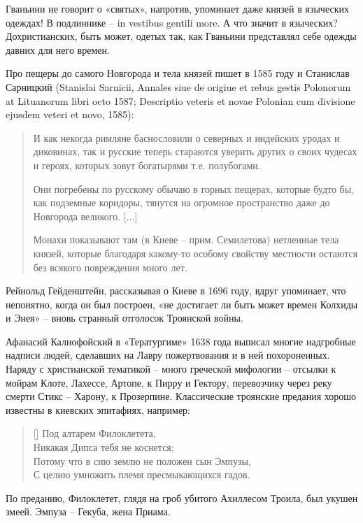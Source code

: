 Гваньини не говорит о «святых», напротив, упоминает даже князей в языческих одеждах! В подлиннике – in vestibus gentili more. А что значит в языческих? Дохристианских, быть может, одетых так, как Гваньини представлял себе одежды давних для него времен.

Про пещеры до самого Новгорода и тела князей пишет в 1585 году и Станислав Сарницкий (Stanislai Sarnicii, Annales siue de origiue et rebus gestis Polonorum at Lituano\-rum libri octo 1587; Descriptio veteris et novae Polonian cum divisione ejusdem veteri et novo, 1585):

\begin{quotation}
И как некогда римляне баснословили о северных и индейских уродах и диковинах, так и русские теперь стараются уверить других о своих чудесах и героях, которых зовут богатырями т.е. полубогами.

Они погребены по русскому обычаю в горных пещерах, которые будто бы, как подземные коридоры, тянутся на огромное пространство даже до Новгорода великого. [...]

Монахи показывают там (в Киеве – прим. Семилетова) нетленные тела князей, которые благодаря какому-то особому свойству местности остаются без всякого повреждения много лет.
\end{quotation}

Рейнольд Гейденштейн, рассказывая о Киеве в 1696 году, вдруг упоминает, что непонятно, когда он был построен, «не достигает ли быть может времен Колхиды и Энея» – вновь странный отголосок Троянской войны.

Афанасий Калнофойский в «Тератургиме» 1638 года выписал многие надгробные надписи людей, сделавших на Лавру пожертвования и в ней похороненных. Наряду с христианской тематикой – много греческой мифологии – отсылки к мойрам Клоте, Лахессе, Артопе, к Пирру и Гектору, перевозчику через реку смерти Стикс – Харону, к Прозерпине. Классические троянские предания хорошо известны в киевских эпитафиях, например:

\settowidth{\versewidth}{Потому что в сию землю не положен сын Эмпузы,} 
\begin{verse}[\versewidth]
Под алтарем Филоклетета,\\
Никакая Дипса тебя не коснется;\\
Потому что в сию землю не положен сын Эмпузы,\\
С целию умножить племя пресмыкающихся гадов.
\end{verse}

По преданию, Филоклетет, глядя на гроб убитого Ахиллесом Троила, был укушен змеей. Эмпуза – Гекуба, жена Приама.

